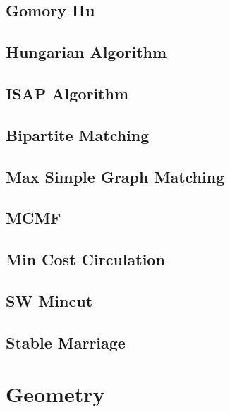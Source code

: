 \documentclass{article}
\begin{document}
\subsection{Gomory Hu}


\subsection{Hungarian Algorithm}


\subsection{ISAP Algorithm}


\subsection{Bipartite Matching}


\subsection{Max Simple Graph Matching}


\subsection{MCMF}


\subsection{Min Cost Circulation}


\subsection{SW Mincut}


\subsection{Stable Marriage}


\section{Geometry}
\end{document}
